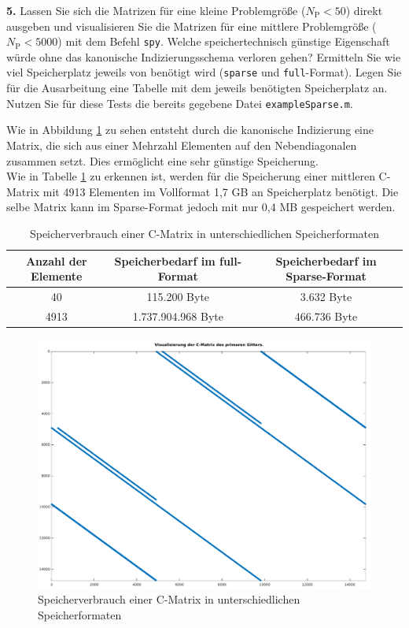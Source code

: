 \documentclass[Protokollheft.tex]{subfiles}
\begin{document}
        \begin{framed}
	\noindent \textbf{5.} Lassen Sie sich die Matrizen für eine kleine Problemgröße ($N_{\text{P}}<50$) direkt
                    ausgeben und visualisieren Sie die Matrizen für eine mittlere
                    Problemgröße ($N_{\text{P}}<5000$) mit dem Befehl \lstinline{spy}. Welche speichertechnisch günstige
                    Eigenschaft würde ohne das kanonische Indizierungsschema verloren gehen?
                    Ermitteln Sie wie viel Speicherplatz jeweils von \matlab benötigt wird
                    (\lstinline{sparse} und \lstinline{full}-Format). Legen Sie für die Ausarbeitung eine Tabelle mit dem jeweils benötigten Speicherplatz an. Nutzen Sie für diese Tests die bereits gegebene Datei \lstinline{exampleSparse.m}.\label{exer:spyStorage}
\end{framed}
\noindent
 Wie in Abbildung \ref{fig:visucmatrixprimgitt} zu sehen entsteht durch die kanonische Indizierung eine Matrix, die sich aus einer Mehrzahl Elementen auf den Nebendiagonalen zusammen setzt. Dies ermöglicht eine sehr günstige Speicherung. \\
 Wie in Tabelle \ref{tbl:speicherCMatrix} zu erkennen ist, werden für die Speicherung einer mittleren C-Matrix mit 4913 Elementen im Vollformat 1,7 GB an Speicherplatz benötigt. Die selbe Matrix kann im Sparse-Format jedoch mit nur 0,4 MB gespeichert werden. 
 \begin{table}
	
 \begin{tabular}{|c|c|c|}
 
 	\hline 
 	Anzahl der Elemente& Speicherbedarf im full-Format &  Speicherbedarf im Sparse-Format\\ 
 	\hline 
 	40& 115.200 Byte & 3.632 Byte \\ 
 	\hline 
 	4913& 1.737.904.968 Byte& 466.736 Byte \\ 
 	\hline 	
 \end{tabular} 	
\caption{Speicherverbrauch einer C-Matrix in unterschiedlichen Speicherformaten}
\label{tbl:speicherCMatrix}
  \end{table}
\begin{figure}
	\centering
	\includegraphics[width=0.7\linewidth]{versuch2/VisuCMatrixPrimGitt}
	\caption{Speicherverbrauch einer C-Matrix in unterschiedlichen Speicherformaten}
	\label{fig:visucmatrixprimgitt}
\end{figure}
\end{document}
